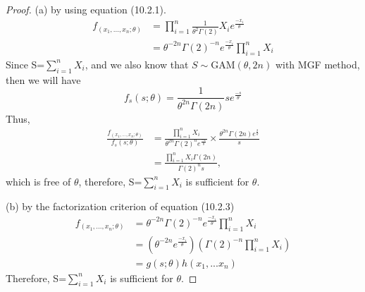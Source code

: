 \begin{proof}[Proof]
(a) by using equation (10.2.1).\newline
   \begin{align*}
    f_(x_1,...,x_n;\theta)&=\prod_{i=1}^n \frac {1}{\theta^2 \Gamma(2)}X_i e^\frac{-x_i}{\theta}\\
                             &=\theta^{-2n}\Gamma(2)^{-n} e^\frac{-x_i}{\theta}\prod_{i=1}^n X_i
  \end{align*}
  Since S=$\sum_{i=1}^n{X_i}$, and we also know that $S\sim\mathrm{GAM}(\theta,2n)$ with MGF method, then we will have\newline
  $$ f_s(s;\theta)=\frac {1}{\theta^{2n}\Gamma(2n)}s e^\frac{-s}{\theta}$$
  Thus,
  \begin{align*}
  \frac{f_(x_1,...,x_n;\theta)}{f_s(s;\theta)}&=\frac{\prod_{i=1}^n X_i}{\theta^{2n}\Gamma(2)^{n}e^\frac{-x}{\theta}}\times\frac{{\theta^{2n}\Gamma(2n)}e^\frac{s}{\theta}}{s}\\
         &=\frac{{\prod_{i=1}^n X_i}\Gamma(2n)}{\Gamma(2)^{n}s},
   \end{align*}
   which is free of $\theta$, therefore, S=$\sum_{i=1}^n X_i$ is sufficient for $\theta$.

   (b)  by the factorization criterion of equation (10.2.3)\newline
   \begin{align*}
   f_(x_1,...,x_n;\theta)&=\theta^{-2n}\Gamma(2)^{-n} e^\frac{-x_i}{\theta}\prod_{i=1}^n X_i\\
                         &=(\theta^{-2n}e^\frac{-x_i}{\theta})(\Gamma(2)^{-n}\prod_{i=1}^n X_i)\\
                         &=g(s;\theta)h(x_1,...x_n)
     \end{align*}
     Therefore, S=$\sum_{i=1}^n X_i$ is sufficient for $\theta$.

\end{proof}


%
